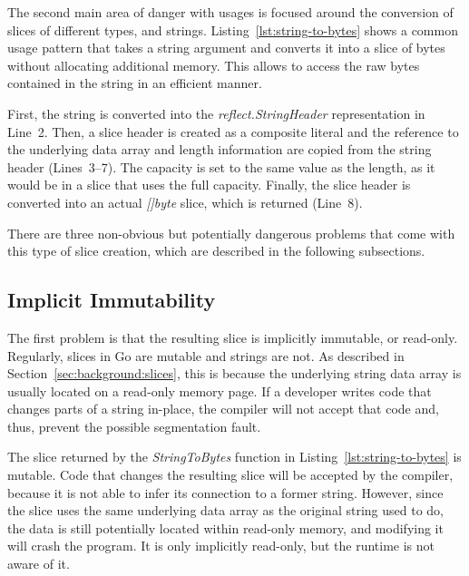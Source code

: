 The second main area of danger with \unsafe{} usages is focused around the conversion of slices of different types, and
strings.
Listing~\ref{lst:string-to-bytes} shows a common \unsafe{} usage pattern that takes a string argument and converts it
into a slice of bytes without allocating additional memory.
This allows to access the raw bytes contained in the string in an efficient manner.



First, the string is converted into the \textit{reflect.StringHeader} representation in Line~2.
Then, a slice header is created as a composite literal and the reference to the underlying data array and length
information are copied from the string header (Lines~3--7).
The capacity is set to the same value as the length, as it would be in a slice that uses the full capacity.
Finally, the slice header is converted into an actual \textit{[]byte} slice, which is returned (Line~8).

There are three non-obvious but potentially dangerous problems that come with this type of slice creation, which are
described in the following subsections.


\subsection{Implicit Immutability}\label{subsec:unsafe-security-problems:slice-casts:read-only}

The first problem is that the resulting slice is implicitly immutable, or read-only.
Regularly, slices in Go are mutable and strings are not.
As described in Section~\ref{sec:background:slices}, this is because the underlying string data array is usually located
on a read-only memory page.
If a developer writes code that changes parts of a string in-place, the compiler will not accept that code and, thus,
prevent the possible segmentation fault.

The slice returned by the \textit{StringToBytes} function in Listing~\ref{lst:string-to-bytes} is mutable.
Code that changes the resulting slice will be accepted by the compiler, because it is not able to infer its connection
to a former string.
However, since the slice uses the same underlying data array as the original string used to do, the data is still
potentially located within read-only memory, and modifying it will crash the program.
It is only implicitly read-only, but the runtime is not aware of it.

